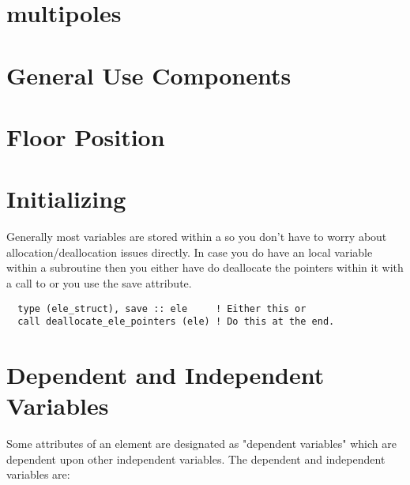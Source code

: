 {{{{%
\section {multipoles}

\section{General Use Components}

\section{Floor Position}

\section{Initializing}

Generally most  variables are stored within a
 so you don't have to worry about
allocation/deallocation issues directly. In case you do have an local
 variable within a subroutine then you either have do
deallocate the pointers within it with a call to
 or you use the save attribute.
\begin{verbatim}
  type (ele_struct), save :: ele     ! Either this or
  call deallocate_ele_pointers (ele) ! Do this at the end.
\end{verbatim}


\section{Dependent and Independent Variables}

Some attributes of an element are designated as "dependent variables"
which are dependent upon other independent variables. The dependent
and independent variables are: \hfil\break
\begin{table}[h]
\end{table}

}}}}
